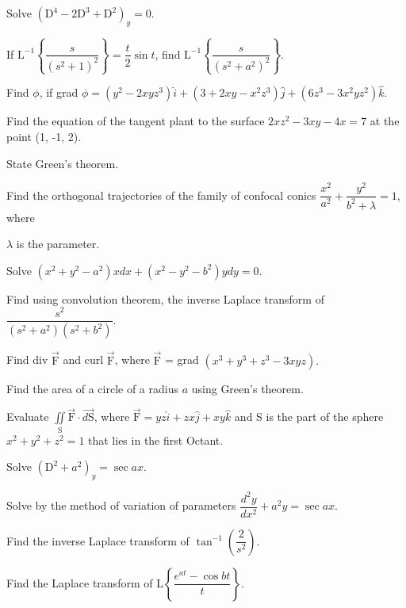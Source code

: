 \sub{\subject}
\maxtime

\partA

\iitem Solve $\left( \text{D}^4 - 2\text{D}^3 + \text{D}^2 \right)_y = 0.$
\item If $\text{L}^{-1} \left\{\dfrac{s}{(s^2 +1)^2}\right\} = \dfrac{t}{2}\sin t$, find $\text{L}^{-1}
  \left\{ \dfrac{s}{(s^2 + a^2)^2} \right\}.$
\item Find $\phi$, if grad $\phi = (y^2 - 2xyz^3)\hat{i} + (3 + 2xy - x^2z^3)\hat{j} 
  + (6z^3 -3x^2yz^2)\hat{k}.$
\item Find the equation of the tangent plant to the surface $2xz^2 - 3xy -4x = 7$ at the point (1, -1, 2).
\item State Green's theorem.

\markA
\partB

\item Find the orthogonal trajectories of the family of confocal conics $\dfrac{x^2}{a^2} +
  \dfrac{y^2}{b^2 + \lambda} =1$, where

  $\lambda$ is the parameter.
\item Solve $(x^2 + y^2 - a^2)xdx + (x^2 - y^2 - b^2)ydy=0.$
\item Find using convolution theorem, the inverse Laplace transform of $\dfrac{s^2}{(s^2+a^2)(s^2+b^2)}.$
\item Find div $\vec{\text{F}}$ and curl $\vec{\text{F}}$, where $\vec{\text{F}}$ = grad
  $(x^3 + y^3 +z^3 - 3xyz).$
\item Find the area of a circle of a radius $a$ using Green's theorem.
\item Evaluate $\iint\limits_{\text{S}}\vec{\text{F}}\cdot \vec{d\text{S}}$, where $\vec{\text{F}} =
  yz\hat{i} + zx \hat{j} + xy\hat{k}$ and S is the part of the sphere
  $x^2 + y^2 + z^2 = 1$ that lies in the first Octant.

\markB

\newpage \again

\partCo

\item \iitem Solve $\left( \text{D}^2 + a^2 \right)_y = \sec ax.$
\Or
\item Solve by the method of variation of parameters $\dfrac{d^2y}{dx^2} + a^2y = \sec ax.$
\ene

\item \iitem Find the inverse Laplace transform of $\tan^{-1}\left(\dfrac{2}{s^2}\right).$
\Or
\item Find the Laplace transform of L$\left\{\dfrac{e^{at} - \cos bt}{t}\right\}.$
\ene

